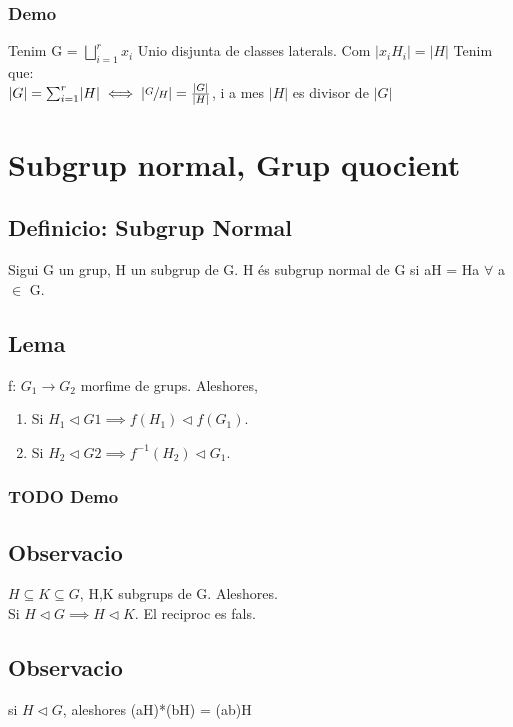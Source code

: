 \documentclass[11pt]{article}
\begin{document}
\subsubsection{Demo}
\label{sec:org23c402c}
    Tenim G = \(\bigsqcup_{i=1}^{r} x_{i}\) Unio disjunta de classes laterals. Com \(\rvert  x_{i}H_{i}  \lvert =  \rvert  H  \lvert\) Tenim que: \\
\(\lvert G  \rvert = \sum_{i=1}^{r}  \lvert H  \rvert \iff  \lvert \sfrac{G}{H} \rvert = \frac{\lvert G \rvert}{\lvert H \rvert}\), i a mes \(\lvert H \rvert\) es divisor de  \(\lvert G \rvert\)  

\section{Subgrup normal, Grup quocient}
\label{sec:orgabb190f}
\subsection{Definicio: Subgrup Normal}
\label{sec:org1aeac77}
Sigui G un grup, H un subgrup de G. H és subgrup normal de G si aH = Ha \(\forall\) a \(\in\) G.
\subsection{Lema}
\label{sec:org70170a1}
f: \(G_1 \to G_2\) morfime de grups. Aleshores,
\begin{enumerate}
\item Si \(H_1 \vartriangleleft G1 \implies f(H_1) \vartriangleleft f(G_1)\).
\item Si \(H_2 \vartriangleleft G2 \implies f^{-1}(H_2) \vartriangleleft G_1\).
\end{enumerate}
\subsubsection{{\bfseries\sffamily TODO} Demo}
\label{sec:orgf6f7e65}

\subsection{Observacio}
\label{sec:orgd4f9a1e}
\(H \subseteq K \subseteq G\), H,K subgrups de G. Aleshores. \\
Si \(H \vartriangleleft G \implies H \vartriangleleft K\). El reciproc es fals.
\subsection{Observacio}
\label{sec:org4dd9b0d}
si \(H \vartriangleleft G\), aleshores (aH)*(bH) = (ab)H
\end{document}
